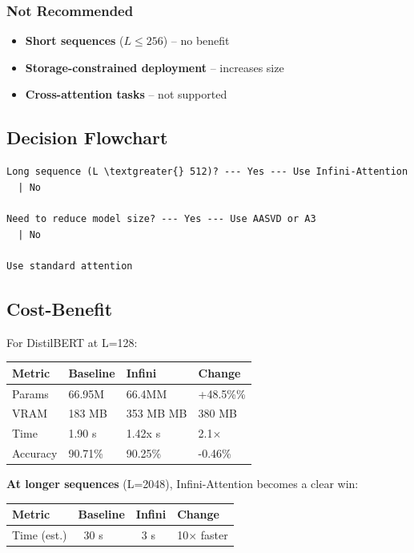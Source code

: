 \subsubsection{Not Recommended}

\begin{itemize}
\item \textbf{Short sequences} ($L \leq 256$) -- no benefit
\item \textbf{Storage-constrained deployment} -- increases size
\item \textbf{Cross-attention tasks} -- not supported

\end{itemize}
\subsection{Decision Flowchart}

\begin{lstlisting}
Long sequence (L \textgreater{} 512)? --- Yes --- Use Infini-Attention
  | No
   
Need to reduce model size? --- Yes --- Use AASVD or A3
  | No
   
Use standard attention
\end{lstlisting}

\subsection{Cost-Benefit}

For DistilBERT at L=128:

\begin{table}[H]
\centering
\small
\begin{tabular}{llll}
\toprule
\textbf{Metric} & \textbf{Baseline} & \textbf{Infini} & \textbf{Change} \\
\midrule
Params & 66.95M & 66.4MM & +48.5\%\% \\
VRAM & 183 MB & 353 MB MB & 380 MB \\
Time & 1.90 s & 1.42x s & 2.1$\times$ \\
Accuracy & 90.71\% & 90.25\% & -0.46\% \\
\bottomrule
\end{tabular}
\end{table}

\textbf{At longer sequences} (L=2048), Infini-Attention becomes a clear win:

\begin{table}[H]
\centering
\small
\begin{tabular}{llll}
\toprule
\textbf{Metric} & \textbf{Baseline} & \textbf{Infini} & \textbf{Change} \\
\midrule
Time (est.) & ~30 s & ~3 s & 10$\times$ faster \\
\bottomrule
\end{tabular}
\end{table}

